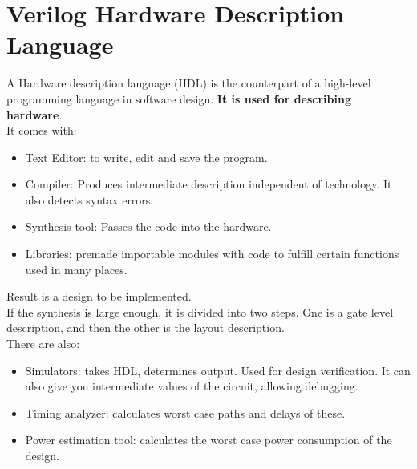 \documentclass[nobib]{tufte-handout}
\begin{document}
\section{Verilog Hardware Description Language}
A Hardware description language (HDL) is the counterpart of a high-level
programming language in software design. \textbf{It is used for describing
    hardware}.\\ It comes with:\\
\begin{itemize}
    \item Text Editor: to write, edit and save the program.
    \item Compiler: Produces intermediate description independent of technology. It also
          detects syntax errors.
    \item Synthesis tool: Passes the code into the hardware.
    \item Libraries: premade importable modules with code to fulfill certain functions
          used in many places.
\end{itemize}
Result is a design to be implemented.\\
If the synthesis is large enough, it is divided into two steps. One is a gate level description, and then the other is the layout description.\\
There are also:
\begin{itemize}
    \item Simulators: takes HDL, determines output. Used for design verification. It can
          also give you intermediate values of the circuit, allowing debugging.
    \item Timing analyzer: calculates worst case paths and delays of these.
    \item Power estimation tool: calculates the worst case power consumption of the
          design.
\end{itemize}
\end{document}
